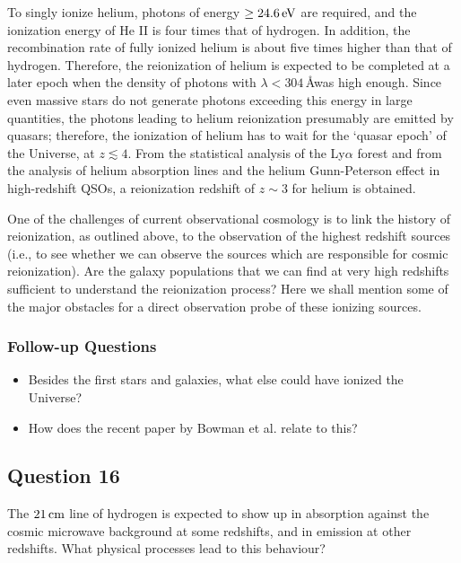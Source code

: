 \documentclass[a4paper,11pt]{article}
\begin{document}
{\noindent}To singly ionize helium, photons of energy $\geq24.6\,{\rm eV}$ are required, and the ionization energy of He II is four times that of hydrogen. In addition, the recombination rate of fully ionized helium is about five times higher than that of hydrogen. Therefore, the reionization of helium is expected to be completed at a later epoch when the density of photons with $\lambda<304$\,\AA was high enough. Since even massive stars do not generate photons exceeding this energy in large quantities, the photons leading to helium reionization presumably are emitted by quasars; therefore, the ionization of helium has to wait for the `quasar epoch' of the Universe, at $z\lesssim4$. From the statistical analysis of the Ly$\alpha$ forest and from the analysis of helium absorption lines and the helium Gunn-Peterson effect in high-redshift QSOs, a reionization redshift of $z\sim3$ for helium is obtained.

{\noindent}One of the challenges of current observational cosmology is to link the history of reionization, as outlined above, to the observation of the highest redshift sources (i.e., to see whether we can observe the sources which are responsible for cosmic reionization). Are the galaxy populations that we can find at very high redshifts sufficient to understand the reionization process? Here we shall mention some of the major obstacles for a direct observation probe of these ionizing sources.

\subsubsection{Follow-up Questions}

\begin{itemize}
    \item Besides the first stars and galaxies, what else could have ionized the Universe?
    \item How does the recent paper by Bowman et al. relate to this?
\end{itemize}


%
%

\newpage
\subsection{Question 16}

The $21\,{\rm cm}$ line of hydrogen is expected to show up in absorption against the cosmic microwave background at some redshifts, and in emission at other redshifts. What physical processes lead to this behaviour?
\end{document}

